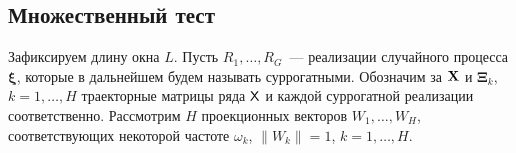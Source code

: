 \documentclass[specialist,
substylefile = spbu_report.rtx,
subf,href,colorlinks=true, 12pt]{disser}
\theoremstyle{definition}
\begin{document}
\subsection{Множественный тест}\label{sect:multiple_test}
Зафиксируем длину окна $L$. Пусть $R_1, \ldots, R_G$~--- реализации случайного процесса $\bm\xi$, которые в дальнейшем будем называть суррогатными. Обозначим за $\mathbf{X}$ и $\bm\Xi_k$, $k=1,\ldots, H$ траекторные матрицы ряда $\mathsf{X}$ и каждой суррогатной реализации соответственно. Рассмотрим $H$ проекционных векторов $W_1,\ldots,W_H$, соответствующих некоторой частоте $\omega_k$, $\|W_k\|=1$, $k=1,\ldots,H$.
\end{document}
